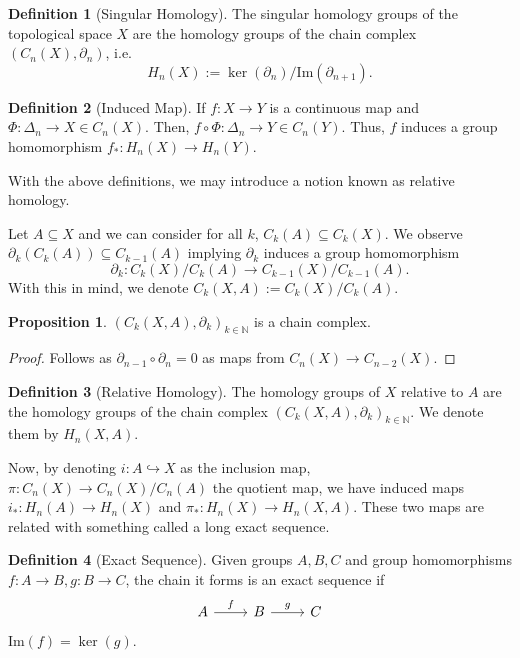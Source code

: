 \documentclass[]{article}
\theoremstyle{definition}
\theoremstyle{definition}
\newtheorem{definition}{Definition}[section]
\newtheorem{proposition}{Proposition}[section]
\begin{document}
\begin{definition}[Singular Homology]
  The singular homology groups of the topological space \(X\) are the homology 
  groups of the chain complex \((C_n(X), \partial_n)\), i.e. 
  \[H_n(X) := \ker(\partial_{n}) / \text{Im}(\partial_{n + 1}).\]
\end{definition}

\begin{definition}[Induced Map]
  If \(f : X \to Y\) is a continuous map and \(\Phi : \Delta_n \to X \in C_n(X)\). 
  Then, \(f \circ \Phi : \Delta_n \to Y \in C_n(Y)\). Thus, \(f\) induces 
  a group homomorphism \(f_* : H_n(X) \to H_n(Y)\).
\end{definition}

With the above definitions, we may introduce a notion known as 
relative homology. 

Let \(A \subseteq X\) and we can consider for all \(k\),
\(C_k(A) \subseteq C_k(X)\). We observe 
\(\partial_k(C_k(A)) \subseteq C_{k - 1}(A)\) implying \(\partial_k\) induces 
a group homomorphism 
\[\partial_k : C_k(X) / C_k(A) \to C_{k - 1}(X) / C_{k - 1}(A).\]
With this in mind, we denote \(C_k(X, A) := C_k(X) / C_k(A)\). 

\begin{proposition}
  \((C_k(X, A), \partial_k)_{k \in \mathbb{N}}\) is a chain complex.
\end{proposition}
\begin{proof}
  Follows as \(\partial_{n - 1} \circ \partial_n = 0\) as maps from 
  \(C_n(X) \to C_{n - 2}(X)\).
\end{proof}

\begin{definition}[Relative Homology]
  The homology groups of \(X\) relative to \(A\) are the homology groups 
  of the chain complex \((C_k(X, A), \partial_k)_{k \in \mathbb{N}}\).
  We denote them by \(H_n(X, A)\).
\end{definition}

Now, by denoting \(i : A \hookrightarrow X\) as the inclusion map, 
\(\pi : C_n(X) \to C_n(X) / C_n(A)\) the quotient map, we have induced maps 
\(i_* : H_n(A) \to H_n(X)\) and \(\pi_* : H_n(X) \to H_n(X, A)\). These 
two maps are related with something called a long exact sequence.

\begin{definition}[Exact Sequence]
  Given groups \(A, B, C\) and group homomorphisms \(f : A \to B, g : B \to C\), 
  the chain it forms is an exact sequence if
  \[\begin{tikzcd}
    A & B & C
    \arrow["f", from=1-1, to=1-2]
    \arrow["g", from=1-2, to=1-3]
  \end{tikzcd}\]
  \(\text{Im}(f) = \ker(g)\).
\end{definition}
\end{document}
